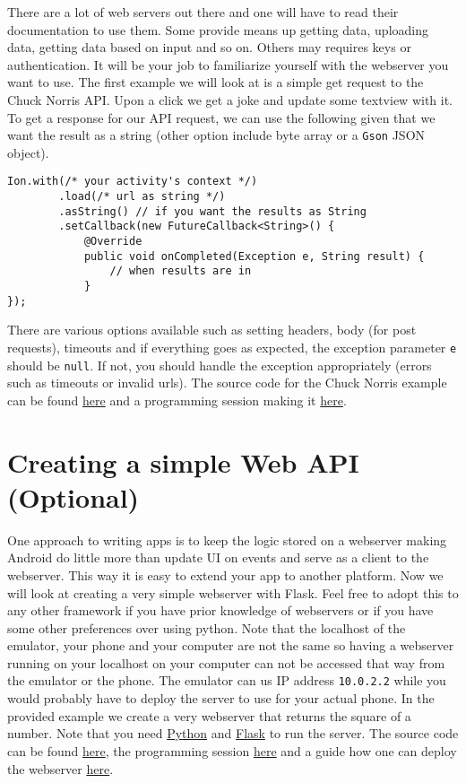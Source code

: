 There are a lot of web servers out there and one will have to read their documentation to use them. Some provide means up getting data, uploading data, getting data based on input and so on. Others may requires keys or authentication. It will be your job to familiarize yourself with the webserver you want to use. The first example we will look at is a simple get request to the Chuck Norris API. Upon a click we get a joke and update some textview with it. To get a response for our API request, we can use the following given that we want the result as a string (other option include byte array or a \texttt{Gson} JSON object).
\begin{lstlisting}[style=A_Java]
Ion.with(/* your activity's context */)
        .load(/* url as string */)
        .asString() // if you want the results as String
        .setCallback(new FutureCallback<String>() {
            @Override
            public void onCompleted(Exception e, String result) {
                // when results are in
            }
});
\end{lstlisting}
There are various options available such as setting headers, body (for post requests), timeouts and if everything goes as expected, the exception parameter \texttt{e} should be \texttt{null}. If not, you should handle the exception appropriately (errors such as timeouts or invalid urls). The source code for the Chuck Norris example can be found \href{https://github.com/JonSteinn/AndroidDevelopment/tree/master/examples/lab4/chucknorris}{here} and a programming session making it \href{TODO}{here}.\\


\section{Creating a simple Web API (Optional)}
One approach to writing apps is to keep the logic stored on a webserver making Android do little more than update UI on events and serve as a client to the webserver. This way it is easy to extend your app to another platform. Now we will look at creating a very simple webserver with Flask. Feel free to adopt this to any other framework if you have prior knowledge of webservers or if you have some other preferences over using python. Note that the localhost of the emulator, your phone and your computer are not the same so having a webserver running on your localhost on your computer can not be accessed that way from the emulator or the phone. The emulator can us IP address \texttt{10.0.2.2} while you would probably have to deploy the server to use for your actual phone. In the provided example we create a very webserver that returns the square of a number. Note that you need \href{https://www.python.org/downloads/}{Python} and \href{http://flask.pocoo.org}{Flask} to run the server. The source code can be found \href{https://github.com/JonSteinn/AndroidDevelopment/tree/master/examples/lab4/squarenumber}{here}, the programming session \href{TODO}{here} and a guide how one can deploy the webserver \href{TODO}{here}.


